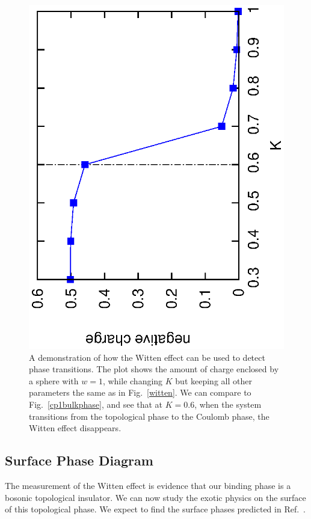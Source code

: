 \documentclass[prb,twocolumn]{revtex4-1}
\newcommand{\scripty}[1]{w}
\begin{document}
\begin{figure}
\includegraphics[angle=-90,width=\linewidth]{figures/wittenphase.eps}
\caption{A demonstration of how the Witten effect can be used to detect phase transitions. The plot shows the amount of charge enclosed by a sphere with $\scripty{r}=1$, while changing $K$ but keeping all other parameters the same as in Fig.~\ref{witten}. We can compare to Fig.~\ref{cp1bulkphase}, and see that at $K=0.6$, when the system transitions from the topological phase to the Coulomb phase, the Witten effect disappears.}
\label{wittenphase}
\end{figure}


\subsection{Surface Phase Diagram}
\label{subsec::cp1surface}
The measurement of the Witten effect is evidence that our binding phase is a bosonic topological insulator. We can now study the exotic physics on the surface of this topological phase. We expect to find the surface phases predicted in Ref.~.
\end{document}
